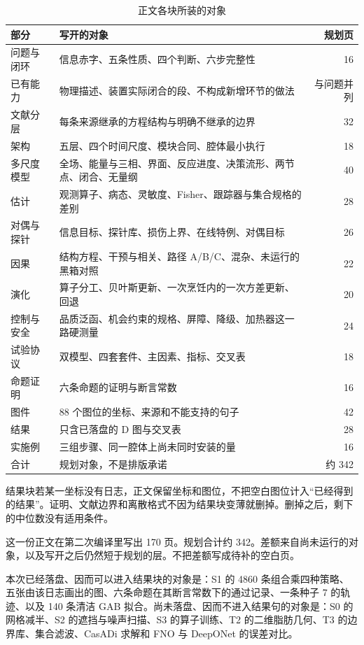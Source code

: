 \begin{table}[ht]
\centering
\caption{正文各块所装的对象}
\begin{tabularx}{\textwidth}{lXr}
\toprule
部分 & 写开的对象 & 规划页 \\
\midrule
问题与闭环 & 信息赤字、五条性质、四个判断、六步完整性 & 16 \\
已有能力 & 物理描述、装置实际闭合的段、不构成新增环节的做法 & 与问题并列 \\
文献分层 & 每条来源继承的方程结构与明确不继承的边界 & 32 \\
架构 & 五层、四个时间尺度、模块合同、腔体最小执行 & 18 \\
多尺度模型 & 全场、能量与三相、界面、反应进度、决策流形、两节点、闭合、无量纲 & 40 \\
估计 & 观测算子、病态、灵敏度、Fisher、跟踪器与集合规格的差别 & 28 \\
对偶与探针 & 信息目标、探针库、损伤上界、在线特例、对偶目标 & 26 \\
因果 & 结构方程、干预与相关、路径 A/B/C、混杂、未运行的黑箱对照 & 22 \\
演化 & 算子分工、贝叶斯更新、一次烹饪内的一次方差更新、回退 & 20 \\
控制与安全 & 品质泛函、机会约束的规格、屏障、降级、加热器这一路硬测量 & 24 \\
试验协议 & 双模型、四套套件、主因素、指标、交叉表 & 18 \\
命题证明 & 六条命题的证明与断言常数 & 16 \\
图件 & 88 个图位的坐标、来源和不能支持的句子 & 42 \\
结果 & 只含已落盘的 D 图与交叉表 & 28 \\
实施例 & 三组步骤、同一腔体上尚未同时安装的量 & 16 \\
\midrule
合计 & 规划对象，不是排版承诺 & 约 342 \\
\bottomrule
\end{tabularx}
\end{table}

结果块若某一坐标没有日志，正文保留坐标和图位，不把空白图位计入“已经得到的结果”。证明、文献边界和离散格式不因为结果块变薄就删掉。删掉之后，剩下的中位数没有适用条件。

这一份正文在第二次编译里写出 170 页。规划合计约 342。差额来自尚未运行的对象，以及写开之后仍然短于规划的层。不把差额写成待补的空白页。

本次已经落盘、因而可以进入结果块的对象是：S1 的 4860 条组合乘四种策略、五张由该日志画出的图、六条命题在其断言常数下的通过记录、一条种子 7 的轨迹、以及 140 条清洁 GAB 拟合。尚未落盘、因而不进入结果句的对象是：S0 的网格减半、S2 的遮挡与噪声扫描、S3 的算子训练、T2 的二维脂肪几何、T3 的边界库、集合滤波、CasADi 求解和 FNO 与 DeepONet 的误差对比。

